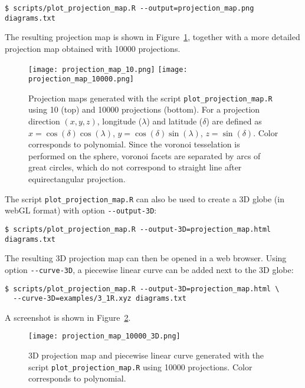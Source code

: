 \begin{lstlisting}
$ scripts/plot_projection_map.R --output=projection_map.png diagrams.txt
\end{lstlisting}
The resulting projection map is shown in Figure~\ref{fig:projectionmap}, together with a more detailed projection map obtained with 10000 projections.
\begin{figure}[t]
\centering
\texttt{[image: projection\_map\_10.png]}
\texttt{[image: projection\_map\_10000.png]}
\caption{Projection maps generated with the script \lstinline{plot_projection_map.R} using 10 (top) and 10000 projections (bottom). For a projection direction $(x,y,z)$, longitude ($\lambda$) and latitude ($\delta$) are defined as $x=\cos(\delta)\cos(\lambda)$, $y=\cos(\delta)\sin(\lambda)$, $z=\sin(\delta)$. Color corresponds to polynomial. Since the voronoi tesselation is performed on the sphere, voronoi facets are separated by arcs of great circles, which do not correspond to straight line after equirectangular projection.}\label{fig:projectionmap}
\end{figure}
The script \lstinline{plot_projection_map.R} can also be used to create a 3D globe (in webGL format\cite{webgl}) with option \lstinline{--output-3D}:
\begin{lstlisting}
$ scripts/plot_projection_map.R --output-3D=projection_map.html diagrams.txt
\end{lstlisting}
The resulting 3D projection map can then be opened in a web browser.
Using option \lstinline{--curve-3D}, a piecewise linear curve can be added next to the 3D globe:
\begin{lstlisting}
$ scripts/plot_projection_map.R --output-3D=projection_map.html \
  --curve-3D=examples/3_1R.xyz diagrams.txt
\end{lstlisting}
A screenshot is shown in Figure~\ref{fig:projectionmap:3D}.
\begin{figure}[t]
\centering
\texttt{[image: projection\_map\_10000\_3D.png]}
\caption{3D projection map and piecewise linear curve generated  with the script \lstinline{plot_projection_map.R} using 10000 projections. Color corresponds to polynomial.}\label{fig:projectionmap:3D}
\end{figure}


